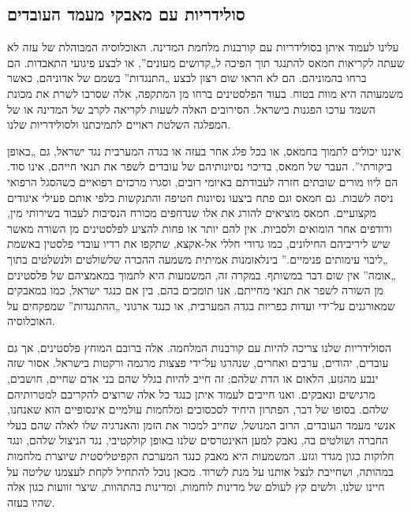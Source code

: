 \subsection*{סולידריות עם מאבקי מעמד העובדים}

עלינו לעמוד איתן בסולידריות עם קורבנות מלחמת המדינה. האוכלוסיה המבוהלת של עזה לא שעתה לקריאות חמאס להתנגד תוך הפיכה ל„קדושים מעונים”, או לבצע פיגועי התאבדות. הם ברחו בהמוניהם. הם לא הראו שום רצון לבצע „התנגדות” בשמם של אדוניהם, כאשר משמעותה היא מוות בטוח. בעוד הפלסטינים ברחו מן המתקפה, אלה שסרבו לשרת את מכונת השמד ערכו הפגנות בישראל. הסירובים האלה לשעות לקריאה לקרב של המדינה או של המפלגה השלטת ראויים לתמיכתנו ולסולידריות שלנו.

איננו יכולים לתמוך בחמאס, או בכל פלג אחר בעזה או בגדה המערבית נגד ישראל, גם „באופן ביקורתי”. העבר של חמאס, בדיכוי נסיונותיהם של עובדים לשפר את תנאי חייהם, אינו סוד. הם ליוו מורים שובתים חזרה לעבודתם באיומי רובים, וסגרו מרכזים רפואיים כשהסגל הרפואי ניסה לשבות. גם חמאס וגם פתח ביצעו נסיונות חטיפה והתנקשות כלפי אותם פעילי איגודים מקצועיים. חמאס מוציאים להורג את אלו שנדחפים מכורח הנסיבות לעבוד בשירותי מין, ורודפים אחר הומואים ולסביות. אין להם יותר או פחות להציע לפלסטינים מן השורה מאשר שיש ליריביהם החילונים, כמו גדודי חללי אל-אקצא, שתקפו את רדיו עובדי פלסטין באשמת „ליבוי עימותים פנימיים.” בינלאומנות אמיתית משמעה ההכרה שלשולטים ולנשלטים בתוך „אומה” אין שום דבר במשותף. במקרה זה, המשמעות היא לתמוך במאמציהם של פלסטינים מן השורה לשפר את תנאי מחייתם. אנו תומכים בהם, בין אם כנגד ישראל, כמו במאבקים שמאורגנים על־ידי ועדות כפריות בגדה המערבית, או כנגד ארגוני „ההתנגדות” שמפקחים על האוכלוסיה.

הסולידריות שלנו צריכה להיות עם קורבנות המלחמה. אלה ברובם המוחץ פלסטינים, אך גם עובדים, יהודים, ערבים ואחרים, שנהרגו על־ידי פצצות מרגמה ורקטות בישראל. אסור שזה ינבע מהגזע, הלאום או הדת שלהם; זה חייב להיות בגלל שהם בני אדם שחיים, חושבים, מרגישים ונאבקים. ואנו חייבים לעמוד איתן כנגד כל אלה שרוצים להקריבם למטרותיהם שלהם. בסופו של דבר, הפתרון היחיד לסכסוכים ומלחמות עולמיים אינסופיים הוא שאנחנו, אנשי מעמד העובדים, הרוב המנושל, שחייב למכור את הזמן והאנרגיה שלו לאלה שהם בעלי החברה ושולטים בה, נאבק למען האינטרסים שלנו באופן קולקטיבי, נגד הניצול שלהם, ונגד חלוקות כגון מגדר וגזע. המשמעות היא מאבק כנגד המערכת הקפיטליסטית שיוצרת מלחמות במהותה, ושחייבת לנצל אותנו על מנת לשרוד. מכאן נוכל להתחיל לקחת לעצמנו שליטה על חיינו שלנו, ולשים קץ לעולם של מדינות לוחמות, ומדינות בהתהוות, שיצר זוועות כגון אלה שהיו בעזה.
